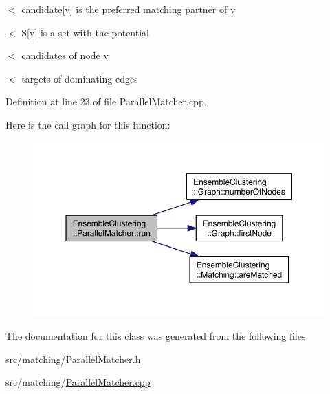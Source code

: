 $<$ candidate\mbox{[}v\mbox{]} is the preferred matching partner of v

$<$ S\mbox{[}v\mbox{]} is a set with the potential

$<$ candidates of node v

$<$ targets of dominating edges 

Definition at line 23 of file Parallel\-Matcher.\-cpp.



Here is the call graph for this function\-:\nopagebreak
\begin{figure}[H]
\begin{center}
\leavevmode
\includegraphics[width=350pt]{class_ensemble_clustering_1_1_parallel_matcher_ad1504bd97f11843772a51bfdf01bfd7a_cgraph}
\end{center}
\end{figure}




The documentation for this class was generated from the following files\-:\begin{DoxyCompactItemize}
\item 
src/matching/\hyperlink{_parallel_matcher_8h}{Parallel\-Matcher.\-h}\item 
src/matching/\hyperlink{_parallel_matcher_8cpp}{Parallel\-Matcher.\-cpp}\end{DoxyCompactItemize}
